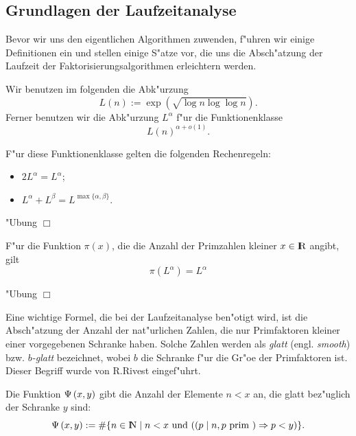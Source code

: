 
\subsection{Grundlagen der Laufzeitanalyse}

Bevor wir uns den eigentlichen Algorithmen zuwenden, f"uhren wir
einige Definitionen ein und stellen einige S"atze vor, die uns die
Absch"atzung der Laufzeit der Faktorisierungsalgorithmen erleichtern
werden.

Wir benutzen im folgenden die Abk"urzung
\begin{equation} 
  L(n) := \exp\left(\sqrt{\log n\log\log n}\right). 
\end{equation}
Ferner benutzen wir die Abk"urzung $L^{\alpha}$ f"ur die Funktionenklasse
\begin{equation} L(n)^{\alpha + o(1)}. \end{equation}

\begin{lemma} F"ur diese Funktionenklasse gelten die folgenden Rechenregeln:
  \begin{itemize}
    \item $2 L^{\alpha} = L^{\alpha}$;
    \item $L^{\alpha} + L^{\beta} = L^{\max\{\alpha,\beta\}}$.
  \end{itemize}
\end{lemma}

\beweis 
"Ubung \hfill $\Box$

\begin{lemma} 
F"ur die Funktion $\pi(x)$, die die Anzahl der Primzahlen kleiner $x\in\R$ angibt, gilt
  \begin{equation}
    \pi(L^{\alpha}) = L^{\alpha} 
  \end{equation}
\end{lemma}

\beweis 
"Ubung \hfill $\Box$

Eine wichtige Formel, die bei der Laufzeitanalyse ben"otigt wird, ist
die Absch"atzung der Anzahl der nat"urlichen Zahlen, die nur
Primfaktoren kleiner einer vorgegebenen Schranke haben. Solche Zahlen
werden als {\em glatt} (engl. {\em smooth}) bzw. {\em $b$-glatt} bezeichnet,
wobei $b$ die Schranke f"ur die Gr"o\3e der Primfaktoren ist. Dieser
Begriff wurde von R.Rivest eingef"uhrt.

\begin{definition}
  Die Funktion $\Psi\left( x,y \right)$ gibt die Anzahl der Elemente $n<x$ an,
  die glatt bez"uglich der Schranke $y$ sind:
  \begin{equation}
    \glatt{x}{y} := \#\{ n\in\N \mid n < x \mbox{ und } 
     (( p \mid n, p \mbox{ prim } ) \Rightarrow p < y )\}.
  \end{equation}
\end{definition} 

